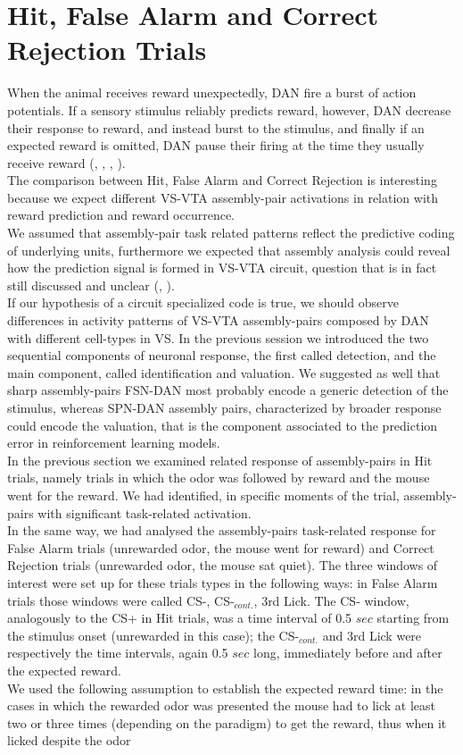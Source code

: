 \section{Hit, False Alarm and Correct Rejection Trials}
\label{sec:FalseAlCorrRej}
When the animal receives reward unexpectedly, DAN fire a burst of action potentials. If a sensory stimulus reliably predicts reward, however, DAN decrease their response to reward, and instead burst to the stimulus, and finally if an expected reward is omitted, DAN pause their firing at the time they usually receive reward (\cite{Schultz1997}, \cite{Wenzel}, \cite{Fiorillo2013b}, \cite{Schultz2015}).\\The comparison between Hit, False Alarm and Correct Rejection is interesting because we expect different VS-VTA assembly-pair activations in relation with reward prediction and reward occurrence.\\We assumed that assembly-pair task related patterns reflect the predictive coding of underlying units, furthermore we expected that assembly analysis could reveal how the prediction signal is formed in VS-VTA circuit, question that is in fact still discussed and unclear (\cite{Takahashi2016}, \cite{Saunders2018}).\\If our hypothesis of a circuit specialized code is true, we should observe differences in activity patterns of VS-VTA assembly-pairs composed by DAN with different cell-types in VS. In the previous session we introduced the two sequential components of neuronal response, the first called detection, and the main component, called identification and valuation. We suggested as well that sharp assembly-pairs FSN-DAN most probably encode a generic detection of the stimulus, whereas SPN-DAN assembly pairs, characterized by broader response could encode the valuation, that is the component associated to the prediction error in reinforcement learning models.\\ In the previous section we examined related response of assembly-pairs in Hit trials, namely trials in which the odor was followed by reward and the mouse went for the reward. We had identified, in specific moments of the trial, assembly-pairs with significant task-related activation.\\In the same way, we had analysed the assembly-pairs task-related response for False Alarm trials (unrewarded odor, the mouse went for reward) and Correct Rejection trials (unrewarded odor, the mouse sat quiet). The three windows of interest were set up for these trials types in the following ways: in False Alarm trials those windows were called CS-, CS-$_{cont.}$, 3rd Lick. The CS- window, analogously to the CS+ in Hit trials, was a time interval of 0.5 $sec$ starting from the stimulus onset (unrewarded in this case); the CS-$_{cont.}$ and 3rd Lick were respectively the time intervals, again 0.5 $sec$ long, immediately before and after the expected reward.\\We used the following assumption to establish the expected reward time: in the cases in which the rewarded odor was presented the mouse had to lick at least two or three times (depending on the paradigm) to get the reward, thus when it licked despite the odor 